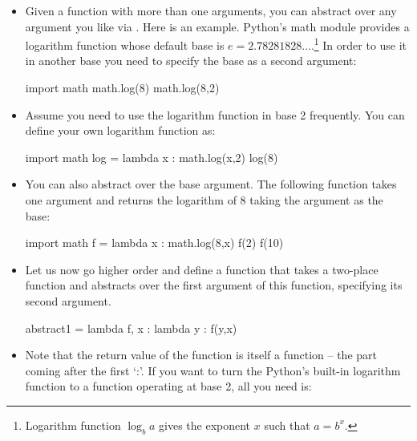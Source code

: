 \documentclass[a4paper]{article}
\begin{document}
{\begin{itemize}
\item Given a function with more than one arguments, you can abstract over any
argument you like via . Here is an example. Python's math module
provides a logarithm function whose default base is
$e=2.78281828\ldots$.\footnote{Logarithm function $\log_b a$ gives the exponent
$x$ such that $a=b^x$.} In order to use it in another base you need to specify
the base as a second argument:


\begin{ucodeframe}
\begin{pyconsole}
import math
math.log(8)
math.log(8,2)
\end{pyconsole}
\end{ucodeframe}

\item[] Assume you need to use the logarithm function in base 2 frequently. You
can define your own logarithm function as:


\begin{ucodeframe}
\begin{pyconsole}
import math
log = lambda x : math.log(x,2)
log(8)
\end{pyconsole}
\end{ucodeframe}

\item You can also abstract over the base argument. The following function takes
one argument and returns the logarithm of 8 taking the argument as the base:

\begin{ucodeframe}
\begin{pyconsole}
import math
f = lambda x : math.log(8,x)
f(2)
f(10)
\end{pyconsole}
\end{ucodeframe}

\item Let us now go higher order and define a function that takes a two-place
function and abstracts over the first argument of this function, specifying its second argument.  

\begin{ucodeframe}
\begin{pyconsole}
abstract1 = lambda f, x : lambda y : f(y,x)
\end{pyconsole}
\end{ucodeframe}

\item[]Note that the return value of the function  is itself a
function -- the part coming after the first `:'. If you want to turn the
Python's built-in logarithm function to a function operating at base 2, all you
need is:



\end{itemize}}
\end{document}
